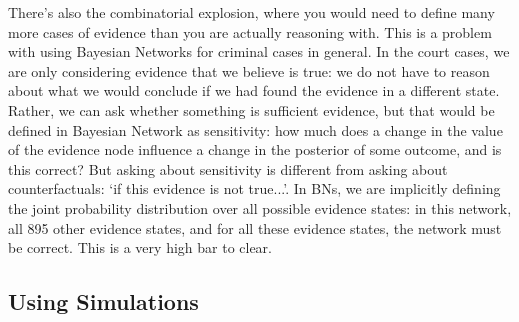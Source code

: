 \documentclass[12pt]{article}
\begin{document}
There's also the combinatorial explosion, where you would need to define many more cases of evidence than you are actually reasoning with. This is a problem with using Bayesian Networks for criminal cases in general. In the court cases, we are only considering evidence that we believe is true: we do not have to reason about what we would conclude if we had found the evidence in a different state. Rather, we can ask whether something is sufficient evidence, but that would be defined in Bayesian Network as sensitivity: how much does a change in the value of the evidence node influence a change in the posterior of some outcome, and is this correct? But asking about sensitivity is different from asking about counterfactuals: `if this evidence is not true...'. In BNs, we are implicitly defining the joint probability distribution over all possible evidence states: in this network, all 895 other evidence states, and for all these evidence states, the network must be correct. This is a very high bar to clear.

                                                                                                                                                                      
\subsection{Using Simulations}
\end{document}
